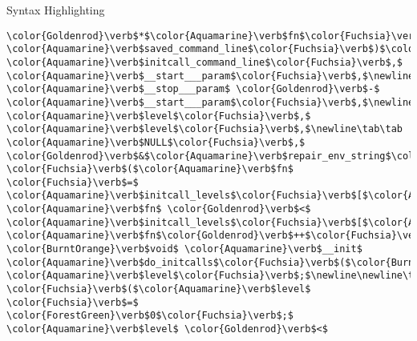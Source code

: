 \begin{frame}{Syntax Highlighting}
\begin{verbatim}
\color{Goldenrod}\verb$*$\color{Aquamarine}\verb$fn$\color{Fuchsia}\verb$;$\newline\newline\tab\color{Aquamarine}\verb$strcpy$\color{Fuchsia}\verb$($\color{Aquamarine}\verb$initcall_command_line$\color{Fuchsia}\verb$,$ \color{Aquamarine}\verb$saved_command_line$\color{Fuchsia}\verb$)$\color{Fuchsia}\verb$;$\newline\tab\color{Aquamarine}\verb$parse_args$\color{Fuchsia}\verb$($\color{Aquamarine}\verb$initcall_level_names$\color{Fuchsia}\verb$[$\color{Aquamarine}\verb$level$\color{Fuchsia}\verb$]$\color{Fuchsia}\verb$,$\newline\tab\tab   \color{Aquamarine}\verb$initcall_command_line$\color{Fuchsia}\verb$,$ \color{Aquamarine}\verb$__start___param$\color{Fuchsia}\verb$,$\newline\tab\tab   \color{Aquamarine}\verb$__stop___param$ \color{Goldenrod}\verb$-$ \color{Aquamarine}\verb$__start___param$\color{Fuchsia}\verb$,$\newline\tab\tab   \color{Aquamarine}\verb$level$\color{Fuchsia}\verb$,$ \color{Aquamarine}\verb$level$\color{Fuchsia}\verb$,$\newline\tab\tab   \color{Aquamarine}\verb$NULL$\color{Fuchsia}\verb$,$ \color{Goldenrod}\verb$&$\color{Aquamarine}\verb$repair_env_string$\color{Fuchsia}\verb$)$\color{Fuchsia}\verb$;$\newline\newline\tab\color{BurntOrange}\verb$for$ \color{Fuchsia}\verb$($\color{Aquamarine}\verb$fn$ \color{Fuchsia}\verb$=$ \color{Aquamarine}\verb$initcall_levels$\color{Fuchsia}\verb$[$\color{Aquamarine}\verb$level$\color{Fuchsia}\verb$]$\color{Fuchsia}\verb$;$ \color{Aquamarine}\verb$fn$ \color{Goldenrod}\verb$<$ \color{Aquamarine}\verb$initcall_levels$\color{Fuchsia}\verb$[$\color{Aquamarine}\verb$level$\color{ForestGreen}\verb$+1$\color{Fuchsia}\verb$]$\color{Fuchsia}\verb$;$ \color{Aquamarine}\verb$fn$\color{Goldenrod}\verb$++$\color{Fuchsia}\verb$)$\newline\tab\tab\color{Aquamarine}\verb$do_one_initcall$\color{Fuchsia}\verb$($\color{Goldenrod}\verb$*$\color{Aquamarine}\verb$fn$\color{Fuchsia}\verb$)$\color{Fuchsia}\verb$;$\newline\color{Fuchsia}\verb$}$\newline\newline\color{BurntOrange}\verb$static$ \color{BurntOrange}\verb$void$ \color{Aquamarine}\verb$__init$ \color{Aquamarine}\verb$do_initcalls$\color{Fuchsia}\verb$($\color{BurntOrange}\verb$void$\color{Fuchsia}\verb$)$\newline\color{Fuchsia}\verb${$\newline\tab\color{BurntOrange}\verb$int$ \color{Aquamarine}\verb$level$\color{Fuchsia}\verb$;$\newline\newline\tab\color{BurntOrange}\verb$for$ \color{Fuchsia}\verb$($\color{Aquamarine}\verb$level$ \color{Fuchsia}\verb$=$ \color{ForestGreen}\verb$0$\color{Fuchsia}\verb$;$ \color{Aquamarine}\verb$level$ \color{Goldenrod}\verb$<$ 
\end{verbatim}
\end{frame}
